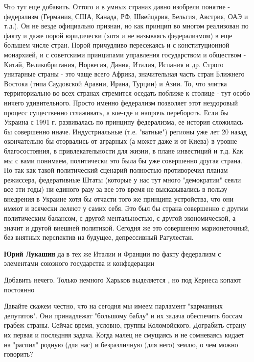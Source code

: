\begin{itemize}
Что тут еще добавить. Оттого и в умных странах давно изобрели понятие -
федерализм (Германия, США, Канада, РФ, Швейцария, Бельгия, Австрия, ОАЭ и
т.д.). Он не везде официально признан, но как принцип во многом реализован по
факту и даже порой юридически (хотя и не называясь федерализмом) в еще большем
числе стран. Порой причудливо пересекаясь и с конституционной монархией, и с
советскими принципами управления государством и обществом - Китай,
Великобритания, Норвегия, Дания, Италия, Испания и др. Строго унитарные страны
- это чаще всего Африка, значительная часть стран Ближнего Востока (типа
Саудовской Аравии, Ирана, Турции) и Азии. То, что элитка территориально во всех
странах стремится оседать поближе к столице - тут особо ничего удивительного.
Просто именно федерализм позволяет этот нездоровый процесс существенно
сглаживать, а кое-где и напрочь перебороть. Если бы Украина с 1991 г.
развивалась по принципу федерализма, ее история сложилась бы совершенно иначе.
Индустриальные (т.е. "ватные") регионы уже лет 20 назад окончательно бы
оторвались от аграрных (а может даже и от Киева) в уровне благосостояния, в
привлекательности для жизни, в плане инвестиций и т.д. Как мы с вами понимаем,
политически это была бы уже совершенно другая страна. Но так как такой
политический сценарий полностью противоречил планам режиссера, федеративные
Штаты (которые у нас тут много "демократии" сеяли все эти годы) ни единого разу
за все это время не высказывались в пользу внедрения в Украине хотя бы отчасти
того же принципа устройства, что они имеют и всячески лелеют у самих себя. Это
был бы страна совершенно с другим политическим балансом, с другой
ментальностью, с другой экономической, а значит и другой внешней политикой.
Сегодня же это совершенно марионеточный, без внятных перспектив на будущее,
депрессивный Рагулестан.

\begin{itemize} %
\textbf{Юрий Лукашин} да в тех же Италии и Франции по факту федерализм с элементами союзного государства и конфедерации
\end{itemize} %

Добавить нечего. Только немного Харьков выделяется , но под Кернеса копают постоянно


Давайте скажем честно, что на сегодня мы имеем парламент "карманных депутатов".
Они принадлежат "большому баблу" и их задача обеспечить боссам грабеж страны.
Сейчас время, условно, группы Коломойского. Дограбить страну их первая и
последняя задача. Когда малец не смущаясь и не сомневаясь кидает на "распил"
родную (для нас) и безразличную (для него) землю, о чем можно говорить?


\end{itemize}
